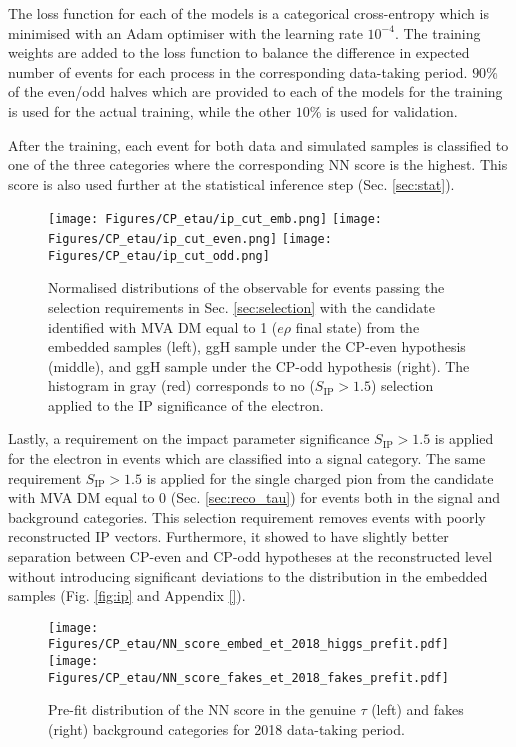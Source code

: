 The loss function for each of the models is a categorical cross-entropy which is minimised with an Adam optimiser \cite{kingma2014adam} with the learning rate $10^{-4}$. The training weights are added to the loss function to balance the difference in expected number of events for each process in the corresponding data-taking period. $90\%$ of the even/odd halves which are provided to each of the models for the training is used for the actual training, while the other $10\%$ is used for validation.

After the training, each event for both data and simulated samples is classified to one of the three categories where the corresponding NN score is the highest. This score is also used further at the statistical inference step (Sec. \ref{sec:stat}). 

\begin{figure}[t!]
    \centering
    \texttt{[image: Figures/CP\_etau/ip\_cut\_emb.png]}
    \texttt{[image: Figures/CP\_etau/ip\_cut\_even.png]}
    \texttt{[image: Figures/CP\_etau/ip\_cut\_odd.png]}
    \caption{Normalised distributions of the \phicp observable for events passing the selection requirements in Sec. \ref{sec:selection} with the \tauh candidate identified with MVA DM equal to 1 ($e\rho$ final state) from the embedded samples (left), ggH sample under the CP-even hypothesis (middle), and ggH sample under the CP-odd hypothesis (right). The histogram in gray (red) corresponds to no ($S_\text{IP} > 1.5$) selection applied to the IP significance of the electron.}
    \label{fig:emb}
\end{figure}

Lastly, a requirement on the impact parameter significance $S_\text{IP} > 1.5$ is applied for the electron in events which are classified into a signal category. The same requirement $S_\text{IP} > 1.5$ is applied for the single charged pion from the \tauh candidate with MVA DM equal to 0 (Sec. \ref{sec:reco_tau}) for events both in the signal and background categories. This selection requirement removes events with poorly reconstructed IP vectors. Furthermore, it showed to have slightly better separation between CP-even and CP-odd hypotheses at the reconstructed level without introducing significant deviations to the \phicp distribution in the embedded samples (Fig. \ref{fig:ip} and Appendix \ref{}).  

\begin{figure}[h!]
    \centering
    \texttt{[image: Figures/CP\_etau/NN\_score\_embed\_et\_2018\_higgs\_prefit.pdf]}
    \texttt{[image: Figures/CP\_etau/NN\_score\_fakes\_et\_2018\_fakes\_prefit.pdf]}
    \caption{Pre-fit distribution of the NN score in the genuine $\tau$ (left) and fakes (right) background categories for 2018 data-taking period.}
    \label{fig:bkgr_cat_prefit}
\end{figure}

